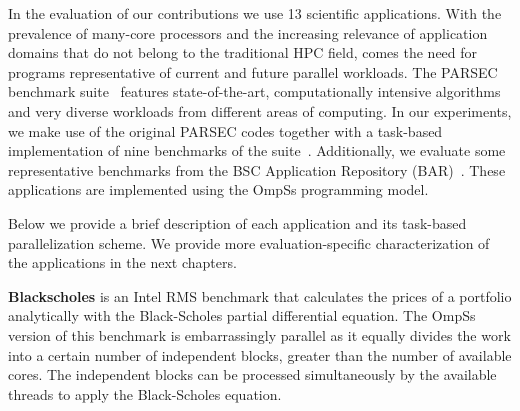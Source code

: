 
In the evaluation of our contributions we use 13 scientific applications. 
With the prevalence of many-core processors and the increasing relevance of application 
domains that do not belong to the traditional HPC field, comes the need for programs 
representative of current and future parallel workloads. 
The PARSEC benchmark suite~\cite{PARSEC3,Bienia:PhD2011} features state-of-the-art, 
computationally intensive algorithms and very diverse workloads from different areas of computing.
In our experiments, we make use of the original PARSEC codes together with a task-based implementation of nine benchmarks of the suite~\cite{Chasapis:TACO2016}. 
Additionally, we evaluate some representative benchmarks from the BSC Application Repository (BAR)~\cite{BAR}.
These applications are implemented using the OmpSs programming model.

Below we provide a brief description of each application and its task-based parallelization scheme. 
We provide more evaluation-specific characterization of the applications in the next chapters.














\textbf{Blackscholes} is an Intel RMS benchmark that calculates the prices of a portfolio analytically with the Black-Scholes partial differential equation. 
The OmpSs version of this benchmark is embarrassingly parallel as it equally divides the work into a certain number of independent blocks, greater than the number of available cores. 
The independent blocks can be processed simultaneously by the available threads to apply the Black-Scholes equation.

